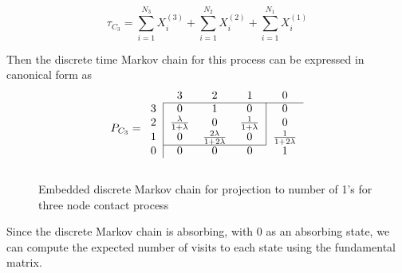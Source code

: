 \begin{equation}
    \tau_{C_3} = \sum_{i = 1}^{N_3} X_i^{(3)} + \sum_{i = 1}^{N_2} X_i^{(2)} + \sum_{i = 1}^{N_1} X_i^{(1)}
\end{equation}

Then the discrete time Markov chain for this process can be expressed in canonical form as
$$
P_{C_3} = \begin{blockarray}{ccccc}
    & 3 & 2 & 1 & 0\\
    \begin{block}{c|ccc|c}
    \cline{2-5}
        3 & 0 & 1 & 0 & 0 \\
        2 & \frac{\lambda}{1 + \lambda} & 0 &
        \frac{1}{1 + \lambda} & 0\\
        1 & 0 & \frac{2\lambda}{1 + 2 \lambda} & 0 & \frac{1}{1 + 2\lambda}\\
    \cline{2-4}
    \end{block}
    \begin{block}{c|cccc}
    0 & 0 & 0 & 0 & 1\\
    \end{block}
\end{blockarray}
$$

\begin{figure}[H]
    \centering
    \caption{Embedded discrete Markov chain for projection to number of 1's for three node contact process}
    \label{fig:discrete_mc_three_contact}
\end{figure}

Since the discrete Markov chain is absorbing, with 0 as an absorbing state, we can compute the expected number of visits to each state using the fundamental matrix.


